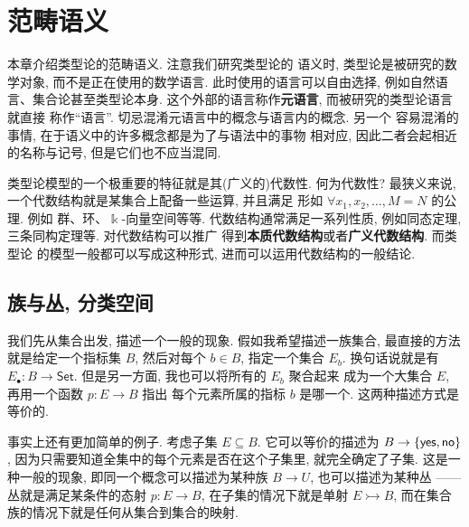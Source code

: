 \chapter{范畴语义}

本章介绍类型论的范畴语义. 注意我们研究类型论的
语义时, 类型论是被研究的数学对象, 而不是正在使用的数学语言.
此时使用的语言可以自由选择, 例如自然语言、集合论甚至类型论本身.
这个外部的语言称作\textbf{元语言}, 而被研究的类型论语言就直接
称作“语言”. 切忌混淆元语言中的概念与语言内的概念. 另一个
容易混淆的事情, 在于语义中的许多概念都是为了与语法中的事物
相对应, 因此二者会起相近的名称与记号, 但是它们也不应当混同.

类型论模型的一个极重要的特征就是其(广义的)代数性. 何为代数性?
最狭义来说, 一个代数结构就是某集合上配备一些运算, 并且满足
形如 \(\forall x_1, x_2, \dots, M = N\) 的公理. 例如
群、环、\(\Bbbk\)-向量空间等等. 代数结构通常满足一系列性质,
例如同态定理, 三条同构定理等. 对代数结构可以推广
得到\textbf{本质代数结构}或者\textbf{广义代数结构}. 而类型论
的模型一般都可以写成这种形式, 进而可以运用代数结构的一般结论.

\section{族与丛, 分类空间}

我们先从集合出发, 描述一个一般的现象.
假如我希望描述一族集合, 最直接的方法就是给定一个指标集 \(B\),
然后对每个 \(b \in B\), 指定一个集合 \(E_b\).
换句话说就是有 \(E_\bullet : B \to \mathsf{Set}\).
但是另一方面, 我也可以将所有的 \(E_b\) 聚合起来
成为一个大集合 \(E\), 再用一个函数 \(p : E \to B\) 指出
每个元素所属的指标 \(b\) 是哪一个. 这两种描述方式是等价的.

\begin{center}
\end{center}

事实上还有更加简单的例子. 考虑子集 \(E \subseteq B\).
它可以等价的描述为 \(B \to \{\textnormal{\textsf{yes}}, \textnormal{\textsf{no}}\}\),
因为只需要知道全集中的每个元素是否在这个子集里, 就完全确定了子集.
这是一种一般的现象, 即同一个概念可以描述为某种族 \(B \to U\),
也可以描述为某种丛 ------ 丛就是满足某条件的态射 \(p : E \to B\),
在子集的情况下就是单射 \(E \rightarrowtail B\),
而在集合族的情况下就是任何从集合到集合的映射.

